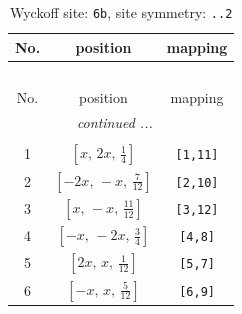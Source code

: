 \documentclass[fleqn,8pt]{jsarticle}
\begin{document}
\begin{longtable}{ccc}
\caption{Wyckoff site: {\tt 6b}, site symmetry: {\tt ..2}}
 \\
 \hline \hline
No. & position & mapping \\ \hline \endfirsthead

\multicolumn{2}{l}{\tablename\ \thetable{}} \\
 \hline \hline
No. & position & mapping \\ \hline \endhead

 \hline \hline
\multicolumn{2}{r}{\footnotesize\it continued ...} \\ \endfoot

 \hline \hline
\multicolumn{2}{r}{} \\ \endlastfoot

1 & $\left[ x,\, 2 x,\, \frac{1}{4} \right]$ & {\tt [1,11]} \\ \hline
2 & $\left[ - 2 x,\, - x,\, \frac{7}{12} \right]$ & {\tt [2,10]} \\ \hline
3 & $\left[ x,\, - x,\, \frac{11}{12} \right]$ & {\tt [3,12]} \\ \hline
4 & $\left[ - x,\, - 2 x,\, \frac{3}{4} \right]$ & {\tt [4,8]} \\ \hline
5 & $\left[ 2 x,\, x,\, \frac{1}{12} \right]$ & {\tt [5,7]} \\ \hline
6 & $\left[ - x,\, x,\, \frac{5}{12} \right]$ & {\tt [6,9]} \\
\end{longtable}
\renewcommand{\arraystretch}{1.2}
\end{document}
